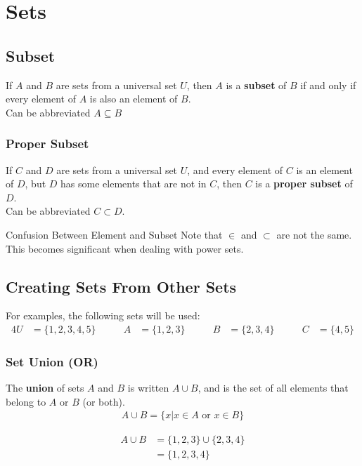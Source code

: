 \documentclass[../notes.tex]{subfiles}
\begin{document}
  \chapter{Sets}
    \section{Subset}
      If $A$ and $B$ are sets from a universal set $U$, then $A$ is a \textbf{subset} of $B$ if and only if every element of $A$ is also an element of $B$.\\
      Can be abbreviated $A \subseteq B$
      \subsection{Proper Subset}
        If $C$ and $D$ are sets from a universal set $U$, and every element of $C$ is an element of $D$, but $D$ has some elements that are not in $C$, then $C$ is a \textbf{proper subset} of $D$.\\
        Can be abbreviated $C \subset D$.
        \begin{notebox}{Confusion Between Element and Subset}
          Note that $\in$ and $\subset$ are not the same. This becomes significant when dealing with power sets.
        \end{notebox}
    \section{Creating Sets From Other Sets}
      For examples, the following sets will be used:
      \begin{alignat*}{4}
        U &= \{1, 2, 3, 4, 5\}\qquad & A &= \{1, 2, 3\} \qquad & B &= \{2, 3, 4\} \qquad & C &= \{4, 5\}
      \end{alignat*}

      \subsection{Set Union (OR)}
        The \textbf{union} of sets $A$ and $B$ is written $A \cup B$, and is the set of all elements that belong to $A$ or $B$ (or both).
        \begin{align*}
          A \cup B = \biggl\{x | x \in A \text{ or } x \in B\biggr\}
        \end{align*}
        \begin{center}
        \end{center}
        \begin{examplebox}
          \begin{align*}
            A \cup B &= \{1, 2, 3\} \cup \{2, 3, 4\}\\
            &= \{1, 2, 3, 4\}
          \end{align*}
        \end{examplebox}
\end{document}
